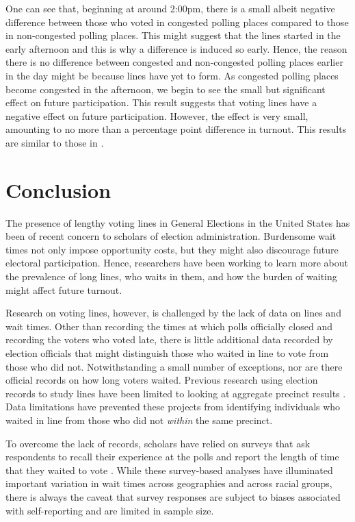\documentclass[12pt,titlepage]{article}
\begin{document}
One can see that, beginning at around 2:00pm, there is a small albeit
negative difference between those who voted in congested polling
places compared to those in non-congested polling places.  This might
suggest that the lines started in the early afternoon and this is why
a difference is induced so early.  Hence, the reason there is no
difference between congested and non-congested polling places earlier
in the day might be because lines have yet to form. As congested
polling places become congested in the afternoon, we begin to see the
small but significant effect on future participation.  This result
suggests that voting lines have a negative effect on future
participation.  However, the effect is very small, amounting to no
more than a percentage point difference in turnout.  This results are
similar to those in \citet{pettigrew:longlinesminorityprecincts}.

\section*{Conclusion}

The presence of lengthy voting lines in General Elections in the
United States has been of recent concern to scholars of election
administration. Burdensome wait times not only impose opportunity
costs, but they might also discourage future electoral participation.
Hence, researchers have been working to learn more about the
prevalence of long lines, who waits in them, and how the burden of
waiting might affect future turnout.

Research on voting lines, however, is challenged by the lack of data
on lines and wait times.  Other than recording the times at which
polls officially closed and recording the voters who voted late, there
is little additional data recorded by election officials that might
distinguish those who waited in line to vote from those who did not.
Notwithstanding a small number of exceptions, nor are there official
records on how long voters waited.  Previous research using election
records to study lines have been limited to looking at aggregate
precinct results \citep{herronsmith:closingtimes,
  pettigrew:longlinesminorityprecincts}.  Data limitations have
prevented these projects from identifying individuals who waited in
line from those who did not \emph{within} the same precinct.

To overcome the lack of records, scholars have relied on surveys that
ask respondents to recall their experience at the polls and report the
length of time that they waited to vote
\citep{stewart:waitingtovote2012, pettigrew:racegapwaittimes}.  While
these survey-based analyses have illuminated important variation in
wait times across geographies and across racial groups, there is
always the caveat that survey responses are subject to biases
associated with self-reporting and are limited in sample size.
\end{document}
